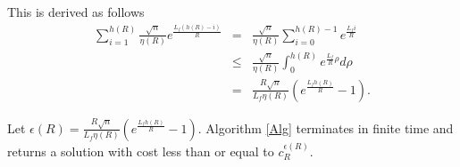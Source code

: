 \documentclass{llncs}
\begin{document}
This is derived as follows 
\begin{equation}
\begin{array}{rcl}
\sum_{i=1}^{h(R)}\frac{\sqrt{n}}{\eta(R)}e^{\frac{L_{f}(h(R)-i)}{R}} & = & \frac{\sqrt{n}}{\eta(R)}\sum_{i=0}^{h(R)-1}e^{\frac{L_{f}i}{R}}\\
 & \leq & \frac{\sqrt{n}}{\eta(R)}\int_{0}^{h(R)}e^{\frac{L_{f}}{R}\rho}d\rho\\
 & = & \frac{R\sqrt{n}}{L_{f}\eta(R)}\left(e^{\frac{L_{f}h(R)}{R}}-1\right).
\end{array}
\end{equation}
\begin{theorem}\label{thm:main}
Let $\epsilon(R)=\frac{R\sqrt{n}}{L_{f}\eta(R)}\left(e^{\frac{L_{f}h(R)}{R}}-1\right)$. Algorithm \ref{Alg} terminates in finite time and returns a solution with cost less than or equal to $c^{\epsilon(R)}_R$.
\end{theorem}
%
\end{document}
